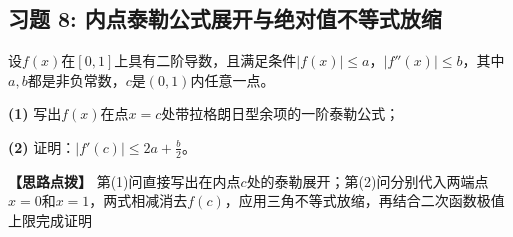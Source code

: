 \documentclass[11pt,a4paper,UTF8]{ctexart}
\begin{document}
\subsection{习题 8: 内点泰勒公式展开与绝对值不等式放缩}

设$f(x)$在$[0, 1]$上具有二阶导数，且满足条件$\vert{}f(x)\vert{} \le a$，$\vert{}f''(x)\vert{} \le b$，其中$a, b$都是非负常数，$c$是$(0, 1)$内任意一点。

\textbf{(1)}  写出$f(x)$在点$x = c$处带拉格朗日型余项的一阶泰勒公式；

\textbf{(2)}  证明：$\vert{}f'(c)\vert{} \le 2a + \frac{b}{2}$。

\textbf{\color{DeepPurple}【思路点拨】} 第(1)问直接写出在内点$c$处的泰勒展开；第(2)问分别代入两端点$x=0$和$x=1$，两式相减消去$f(c)$，应用三角不等式放缩，再结合二次函数极值上限完成证明
\end{document}
